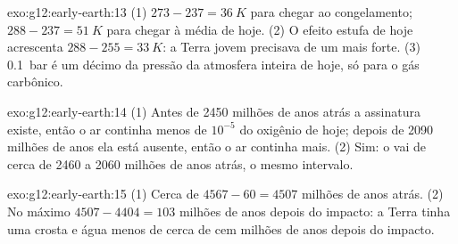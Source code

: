 \begin{solution}{exo:g12:early-earth:13}
(1) $273 - 237 = \qty{36}{K}$ para chegar ao congelamento; $288 - 237 = \qty{51}{K}$ para
chegar à média de hoje. (2) O efeito estufa de hoje acrescenta $288 - 255 =
\qty{33}{K}$: a Terra jovem precisava de um mais forte. (3) \qty{0.1}{bar} é um
décimo da pressão da atmosfera inteira de hoje, só para o gás carbônico.
\end{solution}

\begin{solution}{exo:g12:early-earth:14}
(1) Antes de 2450 milhões de anos atrás a assinatura existe, então o ar
continha menos de $10^{-5}$ do oxigênio de hoje; depois de 2090 milhões de
anos ela está ausente, então o ar continha mais. (2) Sim: o  vai de cerca de 2460 a 2060 milhões de anos atrás, o mesmo intervalo.
\end{solution}

\begin{solution}{exo:g12:early-earth:15}
(1) Cerca de $4567 - 60 = 4507$ milhões de anos atrás. (2) No máximo $4507 - 4404 =
103$ milhões de anos depois do impacto: a Terra tinha uma crosta e água
menos de cerca de cem milhões de anos depois do impacto.
\end{solution}

